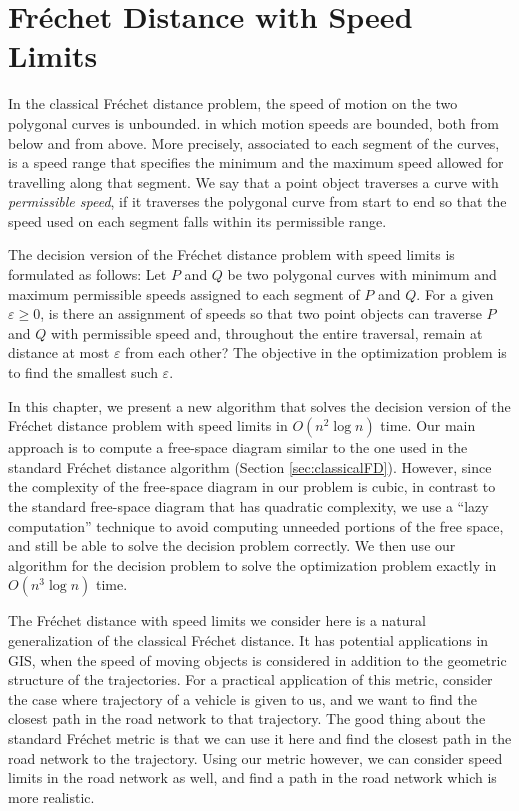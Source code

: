 \documentclass[12pt]{dalthesis}
\newcommand{\gee}{\geqslant}
\newcommand{\eps}{\varepsilon}
\newcommand{\Frechet}{Fr\'echet }
\begin{document}
\clearpage{}\chapter{\Frechet Distance with Speed Limits}
\label{ch:speedFD}
In the classical \Frechet distance problem, 
the speed of motion on the two polygonal curves is unbounded.
 in which  motion speeds are bounded, both from below and from above. 
More precisely, associated to each segment of the curves, 
is a speed range
that specifies the minimum and the maximum speed allowed for travelling along that segment.
We say that a point object traverses a curve with \emph{permissible speed},
if it traverses the polygonal curve from start to end
so that the speed used on each segment falls within its permissible range.

The decision version of the \Frechet distance problem with speed limits is formulated as follows:
Let $P$ and $Q$ be two polygonal curves with minimum and maximum permissible speeds
assigned to each segment of $P$ and $Q$.
For a given $\eps \gee 0$, is there an assignment of speeds so that two point objects
can traverse $P$ and $Q$ with permissible speed and, throughout the entire
traversal, remain at distance at most $\eps$ from each other?
The objective in the optimization problem is to find the smallest such $\eps$.

In this chapter, we present a new algorithm that solves the 
decision version of the \Frechet distance problem with speed limits in $O(n^2 \log n)$ time. 
Our main approach is to compute a free-space diagram 
similar to the one used in the standard \Frechet distance algorithm (Section \ref{sec:classicalFD}).
However, since the complexity of the free-space diagram  in our problem
is cubic, in contrast to the standard free-space diagram that has quadratic complexity,  
we use a ``lazy computation'' technique to
avoid computing unneeded portions of the free space, 
and still be able to solve the decision problem correctly.
We then use our algorithm for the decision problem to
solve the optimization problem exactly in $O(n^3 \log n)$ time.

The \Frechet distance with speed limits we consider here
is a natural generalization of the classical \Frechet distance.
It has potential applications in GIS, when the speed of moving objects is considered
in addition to the geometric structure of the trajectories.
For a practical application of this metric, 
consider the case where 
trajectory of a vehicle is given 
to us, and we want to find the closest path in the road network to that trajectory. The good thing about the standard \Frechet metric 
is that we can use it here and find the closest path in the road network to the trajectory. 
Using our metric however, we can consider speed limits in the road network as well, 
and find a path in the road network which is more realistic.
\end{document}
